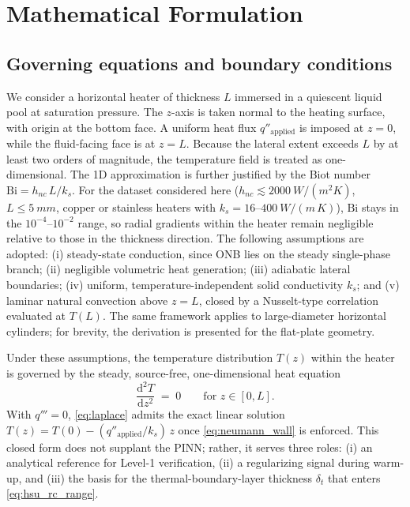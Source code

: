 
\section{Mathematical Formulation}\label{sec:formulation}

\subsection{Governing equations and boundary conditions}\label{subsec:governing}%
\label{subsec:setup}\label{subsec:pde}\label{subsec:bc}

We consider a horizontal heater of thickness $L$ immersed in a quiescent
liquid pool at saturation pressure. The $z$-axis is taken normal to the
heating surface, with origin at the bottom face. A uniform heat flux
$q''_{\mathrm{applied}}$ is imposed at $z=0$, while the fluid-facing face
is at $z=L$. Because the lateral extent exceeds $L$ by at
least two orders of magnitude, the temperature field is treated as
one-dimensional. The 1D approximation is further justified by the
Biot number $\mathrm{Bi} = h_{nc}\,L/k_s$. For the dataset considered
here ($h_{nc} \lesssim \SI{2000}{W/(m^2 K)}$, $L \le \SI{5}{mm}$,
copper or stainless heaters with $k_s = 16$--$\SI{400}{W/(m\,K)}$),
$\mathrm{Bi}$ stays in the $10^{-4}$--$10^{-2}$ range, so radial
gradients within the heater remain negligible relative to those in
the thickness direction. The following assumptions are adopted:
(i) steady-state conduction, since ONB lies on the steady single-phase
branch; (ii) negligible volumetric heat generation; (iii) adiabatic lateral
boundaries; (iv) uniform, temperature-independent solid conductivity $k_s$;
and (v) laminar natural convection above $z=L$, closed by a Nusselt-type
correlation evaluated at $T(L)$.
The same framework applies to large-diameter horizontal cylinders; for
brevity, the derivation is presented for the flat-plate geometry.

Under these assumptions, the temperature distribution $T(z)$ within the
heater is governed by the steady, source-free, one-dimensional heat
equation
%
\begin{equation}\label{eq:laplace}
\frac{\mathrm{d}^{2} T}{\mathrm{d} z^{2}} \;=\; 0
\qquad \text{for } z \in [0,L].
\end{equation}
%
With $q'''=0$, \cref{eq:laplace} admits the exact linear solution
$T(z) = T(0) - (q''_{\mathrm{applied}}/k_s)\, z$ once
\cref{eq:neumann_wall} is enforced. This closed form does not supplant
the PINN; rather, it serves three roles: (i) an analytical reference for
Level-1 verification, (ii) a regularizing signal during warm-up, and (iii)
the basis for the thermal-boundary-layer thickness $\delta_t$ that enters
\cref{eq:hsu_rc_range}.

